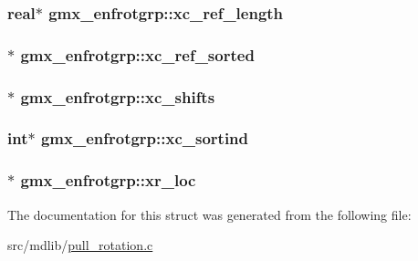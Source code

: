 \hypertarget{structgmx__enfrotgrp_addd51634550328418351a23e7cf482a7}{
\subsubsection[{xc\-\_\-ref\-\_\-length}]{\setlength{\rightskip}{0pt plus 5cm}real$\ast$ {\bf gmx\-\_\-enfrotgrp\-::xc\-\_\-ref\-\_\-length}}}\label{structgmx__enfrotgrp_addd51634550328418351a23e7cf482a7}
\hypertarget{structgmx__enfrotgrp_a87474ab604cc5efb71ea5241c6ba7d90}{
\subsubsection[{xc\-\_\-ref\-\_\-sorted}]{$\ast$ {\bf gmx\-\_\-enfrotgrp\-::xc\-\_\-ref\-\_\-sorted}}}\label{structgmx__enfrotgrp_a87474ab604cc5efb71ea5241c6ba7d90}
\hypertarget{structgmx__enfrotgrp_a9cf22da2bed481b4aa1a0c7bcf1fd8a9}{
\subsubsection[{xc\-\_\-shifts}]{$\ast$ {\bf gmx\-\_\-enfrotgrp\-::xc\-\_\-shifts}}}\label{structgmx__enfrotgrp_a9cf22da2bed481b4aa1a0c7bcf1fd8a9}
\hypertarget{structgmx__enfrotgrp_adf5ea7f0e3d7af1ac9cf585186458aa9}{
\subsubsection[{xc\-\_\-sortind}]{\setlength{\rightskip}{0pt plus 5cm}int$\ast$ {\bf gmx\-\_\-enfrotgrp\-::xc\-\_\-sortind}}}\label{structgmx__enfrotgrp_adf5ea7f0e3d7af1ac9cf585186458aa9}
\hypertarget{structgmx__enfrotgrp_a16233fd9b00ee233e954300c63979a40}{
\subsubsection[{xr\-\_\-loc}]{$\ast$ {\bf gmx\-\_\-enfrotgrp\-::xr\-\_\-loc}}}\label{structgmx__enfrotgrp_a16233fd9b00ee233e954300c63979a40}


\-The documentation for this struct was generated from the following file\-:\begin{DoxyCompactItemize}
\item 
src/mdlib/\hyperlink{pull__rotation_8c}{pull\-\_\-rotation.\-c}\end{DoxyCompactItemize}
